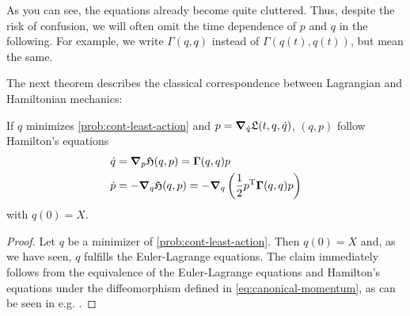As you can see, the equations already become quite cluttered.
Thus, despite the risk of confusion, we will often omit the time dependence of $p$ and $q$ in the following.
For example, we write $\Gamma(q, q)$ instead of $\Gamma(q(t), q(t))$, but mean the same.

The next theorem describes the classical correspondence between Lagrangian and Hamiltonian mechanics:
\begin{theorem}
	\label{theo:hamiltonian-dynamic}
	If $q$ minimizes \cref{prob:cont-least-action} and $p = \grad_{\dot{q}} \mathfrak{L}(t, q, \dot{q})$, $(q, p)$ follow Hamilton's equations
	\begin{equation}
	\label{eq:hamiltonian-system}
		\begin{split}
			\dot{q} &= \grad_p \mathfrak{H}(q, p) = \mathbf{\Gamma}(q, q) p\\
			\dot{p} &= -\grad_q \mathfrak{H}(q, p)
			= -\grad_q \left(\frac{1}{2} p^\mathrm{T} \mathbf{\Gamma}(q, q) p\right)
		\end{split}
	\end{equation}
	with $q(0) = X$.
\end{theorem}
\begin{proof}
	Let $q$ be a minimizer of \cref{prob:cont-least-action}.
	Then $q(0) = X$ and, as we have seen, $q$ fulfills the Euler-Lagrange equations.
	The claim immediately follows from the equivalence of the Euler-Lagrange equations and Hamilton's equations under the diffeomorphism defined in \cref{eq:canonical-momentum}, as can be seen in e.g. \cite{marsden10, goldstein01}.
\end{proof}

